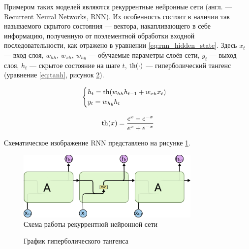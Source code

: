 Примером таких моделей являются рекуррентные нейронные сети (англ. --- Recurrent Neural Networks, RNN). Их особенность состоит в наличии так называемого скрытого состояния --- вектора, накапливающего в себе информацию, полученную от поэлементной обработки входной последовательности, как отражено в уравнении \ref*{eq:rnn_hidden_state}. Здесь $x_t$ --- вход слоя, $w_{hh}$, $w_{xh}$, $w_{hy}$ --- обучаемые параметры слоёв сети, $y_t$ --- выход слоя, $h_t$ --- скрытое состояние на шаге $t$, $\operatorname{th}(\cdot)$ --- гиперболический тангенс (уравнение \ref*{eq:tanh}, рисунок \ref*{fig:tanh}).

\begin{equation}
    \label{eq:rnn_hidden_state}
    \begin{cases}
        h_t = \operatorname{th}(w_{hh}h_{t-1}+w_{xh}x_t) \\
        y_t = w_{hy}h_t
    \end{cases}
\end{equation}

\begin{equation}
    \label{eq:tanh}
    \operatorname{th}(x)=\frac{e^x-e^{-x}}{e^x+e^{-x}}
\end{equation}

Схематическое изображение RNN представлено на рисунке \ref*{fig:rnn}.

\begin{figure}
    \centering
    \includegraphics[width=0.8\textwidth]{../inc/images/rnn.png}
    \caption{Схема работы рекуррентной нейронной сети}
    \label{fig:rnn}
\end{figure}

\begin{figure}
    \centering
    \caption{График гиперболического тангенса}
    \label{fig:tanh}
\end{figure}

